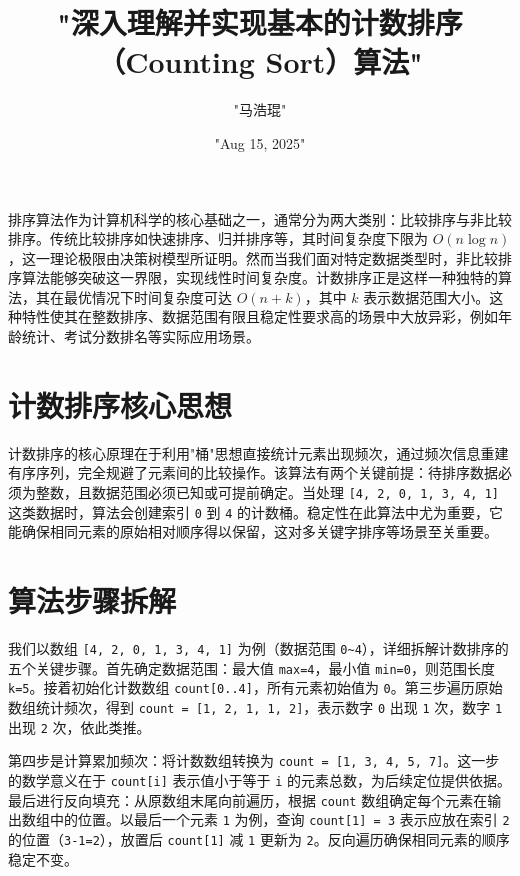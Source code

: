 \title{"深入理解并实现基本的计数排序（Counting Sort）算法"}
\author{"马浩琨"}
\date{"Aug 15, 2025"}
\maketitle
排序算法作为计算机科学的核心基础之一，通常分为两大类别：比较排序与非比较排序。传统比较排序如快速排序、归并排序等，其时间复杂度下限为 $O(n \log{n})$，这一理论极限由决策树模型所证明。然而当我们面对特定数据类型时，非比较排序算法能够突破这一界限，实现线性时间复杂度。计数排序正是这样一种独特的算法，其在最优情况下时间复杂度可达 $O(n + k)$，其中 $k$ 表示数据范围大小。这种特性使其在整数排序、数据范围有限且稳定性要求高的场景中大放异彩，例如年龄统计、考试分数排名等实际应用场景。\par
\chapter{计数排序核心思想}
计数排序的核心原理在于利用"桶"思想直接统计元素出现频次，通过频次信息重建有序序列，完全规避了元素间的比较操作。该算法有两个关键前提：待排序数据必须为整数，且数据范围必须已知或可提前确定。当处理 \texttt{[4, 2, 0, 1, 3, 4, 1]} 这类数据时，算法会创建索引 \texttt{0} 到 \texttt{4} 的计数桶。稳定性在此算法中尤为重要，它能确保相同元素的原始相对顺序得以保留，这对多关键字排序等场景至关重要。\par
\chapter{算法步骤拆解}
我们以数组 \texttt{[4, 2, 0, 1, 3, 4, 1]} 为例（数据范围 \texttt{0\~{}4}），详细拆解计数排序的五个关键步骤。首先确定数据范围：最大值 \texttt{max=4}，最小值 \texttt{min=0}，则范围长度 \texttt{k=5}。接着初始化计数数组 \texttt{count[0..4]}，所有元素初始值为 \texttt{0}。第三步遍历原始数组统计频次，得到 \texttt{count = [1, 2, 1, 1, 2]}，表示数字 \texttt{0} 出现 \texttt{1} 次，数字 \texttt{1} 出现 \texttt{2} 次，依此类推。\par
第四步是计算累加频次：将计数数组转换为 \texttt{count = [1, 3, 4, 5, 7]}。这一步的数学意义在于 \texttt{count[i]} 表示值小于等于 \texttt{i} 的元素总数，为后续定位提供依据。最后进行反向填充：从原数组末尾向前遍历，根据 \texttt{count} 数组确定每个元素在输出数组中的位置。以最后一个元素 \texttt{1} 为例，查询 \texttt{count[1] = 3} 表示应放在索引 \texttt{2} 的位置（\texttt{3-1=2}），放置后 \texttt{count[1]} 减 \texttt{1} 更新为 \texttt{2}。反向遍历确保相同元素的顺序稳定不变。\par
